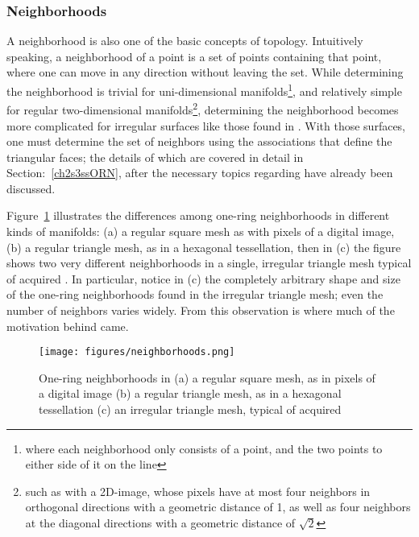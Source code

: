 %
%
\subsubsection{Neighborhoods}
\label{ch2sETBssTsssN}
A neighborhood is also one of the basic concepts of topology. Intuitively speaking, a neighborhood of a point is a set of points containing that point, where one can move in any direction without leaving the set. While determining the neighborhood is trivial for uni-dimensional manifolds\footnote{where each neighborhood only consists of a point, and the two points to either side of it on the line}, and relatively simple for regular two-dimensional manifolds\footnote{such as with a 2D-image, whose pixels have at most four neighbors in orthogonal directions with a geometric distance of 1, as well as four neighbors at the diagonal directions with a geometric distance of $\sqrt{2}$}, determining the neighborhood becomes more complicated for irregular surfaces like those found in \tdd{}. With those surfaces, one must determine the set of neighbors using the associations that define the triangular faces; the details of which are covered in detail in Section:~\ref{ch2s3ssORN}, after the necessary topics regarding \tdd{} have already been discussed.

Figure~\ref{fig:neighborhoods} illustrates the differences among one-ring neighborhoods in different kinds of manifolds: (a) a regular square mesh as with pixels of a digital image, (b) a regular triangle mesh, as in a hexagonal tessellation, then in (c) the figure shows two very different neighborhoods in a single, irregular triangle mesh typical of acquired \tdd{}. In particular, notice in (c) the completely arbitrary shape and size of the one-ring neighborhoods found in the irregular triangle mesh; even the number of neighbors varies widely. From this observation is where much of the motivation behind  came.

\begin{figure}[ht]
\ffigbox
	{\texttt{[image: figures/neighborhoods.png]}}
	{\caption[One-ring neighborhoods in regular and irregular meshes]{One-ring neighborhoods in (a) a regular square mesh, as in pixels of a digital image (b) a regular triangle mesh, as in a hexagonal tessellation (c) an irregular triangle mesh, typical of acquired \tdd{}}\label{fig:neighborhoods}}
\end{figure}

%
%
%
%
%
%
